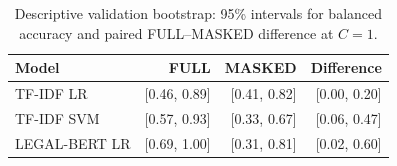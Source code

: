 \begin{table}[t]
\caption{Descriptive validation bootstrap: 95\% intervals for balanced accuracy and paired FULL--MASKED difference at $C=1$.}
\label{tab:bootstrap}
\centering\footnotesize
\setlength{\tabcolsep}{3pt}
\begin{tabular}{lrrr}
\toprule Model & FULL & MASKED & Difference \\
\midrule
TF-IDF LR & [0.46, 0.89] & [0.41, 0.82] & [0.00, 0.20] \\
TF-IDF SVM & [0.57, 0.93] & [0.33, 0.67] & [0.06, 0.47] \\
LEGAL-BERT LR & [0.69, 1.00] & [0.31, 0.81] & [0.02, 0.60] \\
\bottomrule\end{tabular}
\end{table}